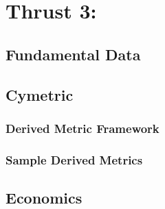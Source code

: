 \chapter{Thrust 3: }\label{chap:thrust3}

\section{Fundamental Data}

\section{Cymetric}

\subsection{Derived Metric Framework}

\subsection{Sample Derived Metrics}

\section{Economics}
